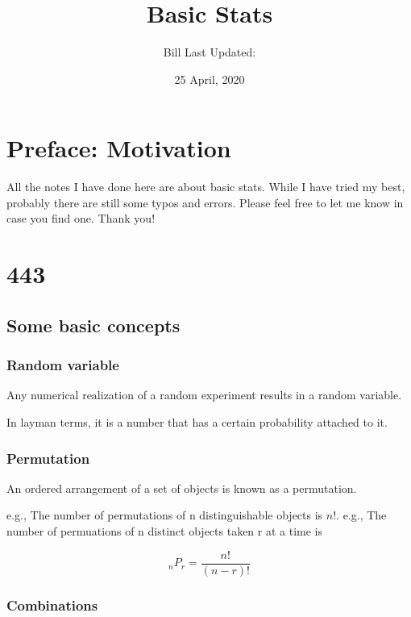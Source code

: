 \documentclass[]{book}
\title{Basic Stats}
\author{Bill Last Updated:}
\date{25 April, 2020}
\begin{document}
\maketitle

{
\setcounter{tocdepth}{1}
\tableofcontents
}
\hypertarget{my-section}{%
\chapter*{Preface: Motivation}\label{my-section}}

All the notes I have done here are about basic stats. While I have tried my best, probably there are still some typos and errors. Please feel free to let me know in case you find one. Thank you!

\hypertarget{section}{%
\chapter{443}\label{section}}

\hypertarget{some-basic-concepts}{%
\section{Some basic concepts}\label{some-basic-concepts}}

\hypertarget{random-variable}{%
\subsection{Random variable}\label{random-variable}}

Any numerical realization of a random experiment results in a random variable.

In layman terms, it is a number that has a certain probability attached to it.

\hypertarget{permutation}{%
\subsection{Permutation}\label{permutation}}

An ordered arrangement of a set of objects is known as a permutation.

e.g., The number of permutations of n distinguishable objects is \(n!\).
e.g., The number of permuations of n distinct objects taken r at a time is

\[_{n}P_r=\frac{n!}{(n-r)!}\]

\hypertarget{combinations}{%
\subsection{Combinations}\label{combinations}}
\end{document}

